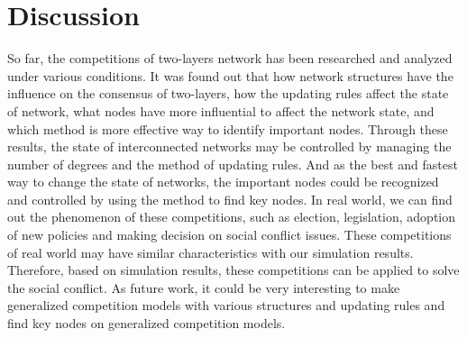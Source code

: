 \section{Discussion} 
So far, the competitions of two-layers network has been researched and analyzed under various conditions. It was found out that how network structures have the influence on the consensus of two-layers, how the updating rules affect the state of network, what nodes have more influential to affect the network state, and which method is more effective way to identify important nodes. Through these results, the state of interconnected networks may be controlled by managing the number of degrees and the method of updating rules. And as the best and fastest way to change the state of networks, the important nodes could be recognized and controlled by using the method to find key nodes.
In real world, we can find out the phenomenon of these competitions, such as election, legislation, adoption of new policies and making decision on social conflict issues. These competitions of real world may have similar characteristics with our simulation results. Therefore, based on simulation results, these competitions can be applied to solve the social conflict. As future work, it could be very interesting to make generalized competition models with various structures and updating rules and find key nodes on generalized competition models.   
